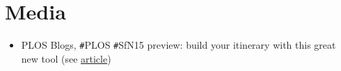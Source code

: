 \section{\sc Media}

\begin{itemize}[leftmargin=0cm, label={}]

\item PLOS Blogs, \texttt{\#}PLOS \texttt{\#}SfN15 preview: build your itinerary with this great new tool (see \href{http://blogs.plos.org/neuro/2015/10/06/plos-sfn15-preview-build-your-itinerary-with-this-great-new-tool/}{article})

\end{itemize}
